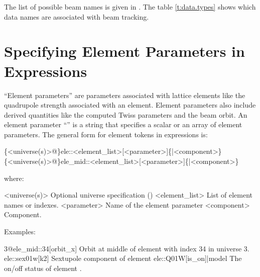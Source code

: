 The list of possible beam  names is given in . The table
\ref{t:data.types} shows which data names are associated with beam tracking.

\section{Specifying Element Parameters in Expressions}
\label{s:ele.token}

``Element parameters'' are parameters associated with lattice elements like the quadrupole
strength associated with an element. Element parameters also include derived quantities
like the computed Twiss parameters and the beam orbit. An element parameter ``''
is a string that specifies a scalar or an array of element parameters. The general form
for element tokens in expressions is:
\begin{example}
  \{<universe(s)>@\}ele::<element_list>[<parameter>]\{|<component>\}
  \{<universe(s)>@\}ele_mid::<element_list>[<parameter>]\{|<component>\}
\end{example}
where:
\begin{example}
  <universe(s)>       Optional universe specification ()
  <element_list>      List of element names or indexes.
  <parameter>         Name of the element parameter
  <component>         Component. 
\end{example}
Examples:
\begin{example}
  3@ele_mid::34[orbit_x]     Orbit at middle of element with index 34 in universe 3.
  ele::sex01w[k2]            Sextupole component of element 
  ele::Q01W[is_on]|model     The on/off status of element .
\end{example}


